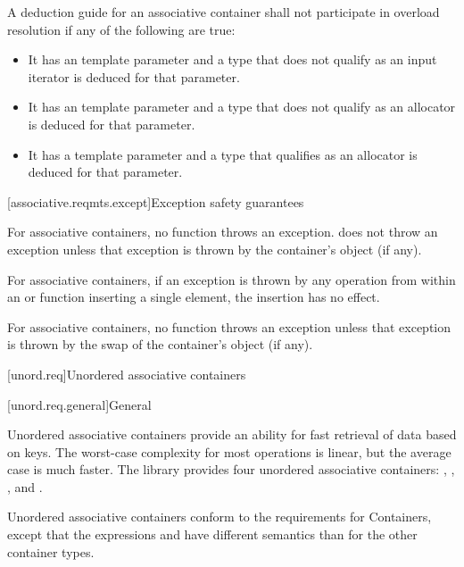 \pnum
A deduction guide for an associative container shall not participate in overload resolution
if any of the following are true:
\begin{itemize}
\item It has an  template parameter
and a type that does not qualify as an input iterator is deduced for that parameter.

\item It has an  template parameter
and a type that does not qualify as an allocator is deduced for that parameter.

\item It has a  template parameter
and a type that qualifies as an allocator is deduced for that parameter.
\end{itemize}

[associative.reqmts.except]{Exception safety guarantees}%
%
%

\pnum
For associative containers, no  function throws an exception.
 does not throw an exception unless that exception is thrown
by the container's  object (if any).

\pnum
For associative containers, if an exception is thrown by any operation from
within an  or  function inserting a single element, the
insertion has no effect.

\pnum
For associative containers, no  function throws an exception unless
that exception is thrown by the
swap of the container's  object (if any).

[unord.req]{Unordered associative containers}%

[unord.req.general]{General}

\pnum
{}%
Unordered associative containers provide an ability for fast retrieval
of data based on keys.  The worst-case complexity for most operations
is linear, but the average case is much faster.  The library provides
four unordered associative containers: ,
, , and
.

\pnum
{}%
%
%
Unordered associative containers conform to the requirements for
Containers, except that
the expressions
 and  have different semantics than for the other
container types.

